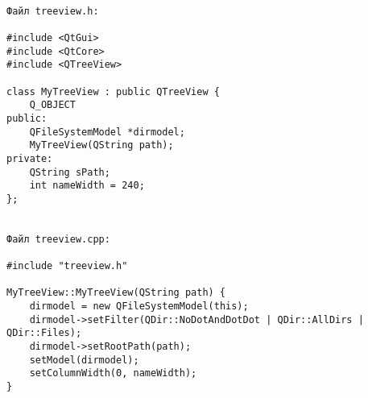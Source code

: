 \begin{verbatim}

Файл treeview.h:

#include <QtGui>
#include <QtCore>
#include <QTreeView>

class MyTreeView : public QTreeView {
    Q_OBJECT
public:
    QFileSystemModel *dirmodel;
    MyTreeView(QString path);
private:
    QString sPath;
    int nameWidth = 240;
};


Файл treeview.cpp:

#include "treeview.h"

MyTreeView::MyTreeView(QString path) {
    dirmodel = new QFileSystemModel(this);
    dirmodel->setFilter(QDir::NoDotAndDotDot | QDir::AllDirs | QDir::Files);
    dirmodel->setRootPath(path);
    setModel(dirmodel);
    setColumnWidth(0, nameWidth);
}
\end{verbatim}
